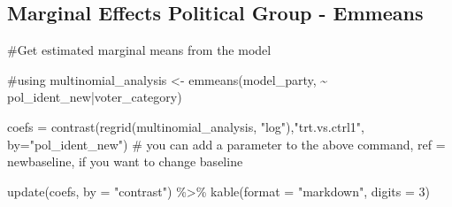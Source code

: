 \documentclass[
  letterpaper,
  DIV=11,
  numbers=noendperiod]{scrartcl}
\newenvironment{Shaded}{\begin{snugshade}}{\end{snugshade}}
\newcommand{\AttributeTok}[1]{\textcolor[rgb]{0.40,0.45,0.13}{#1}}
\newcommand{\CommentTok}[1]{\textcolor[rgb]{0.37,0.37,0.37}{#1}}
\newcommand{\DecValTok}[1]{\textcolor[rgb]{0.68,0.00,0.00}{#1}}
\newcommand{\FunctionTok}[1]{\textcolor[rgb]{0.28,0.35,0.67}{#1}}
\newcommand{\NormalTok}[1]{\textcolor[rgb]{0.00,0.23,0.31}{#1}}
\newcommand{\OtherTok}[1]{\textcolor[rgb]{0.00,0.23,0.31}{#1}}
\newcommand{\SpecialCharTok}[1]{\textcolor[rgb]{0.37,0.37,0.37}{#1}}
\newcommand{\StringTok}[1]{\textcolor[rgb]{0.13,0.47,0.30}{#1}}
\begin{document}
\subsection{Marginal Effects Political Group -
Emmeans}\label{marginal-effects-political-group---emmeans}

\begin{Shaded}
\begin{Highlighting}[]
\CommentTok{\#Get estimated marginal means from the model}

\CommentTok{\#using }
\NormalTok{multinomial\_analysis }\OtherTok{\textless{}{-}} \FunctionTok{emmeans}\NormalTok{(model\_party, }\SpecialCharTok{\textasciitilde{}}\NormalTok{ pol\_ident\_new}\SpecialCharTok{|}\NormalTok{voter\_category)}

\NormalTok{coefs }\OtherTok{=} \FunctionTok{contrast}\NormalTok{(}\FunctionTok{regrid}\NormalTok{(multinomial\_analysis, }\StringTok{"log"}\NormalTok{),}\StringTok{"trt.vs.ctrl1"}\NormalTok{,  }\AttributeTok{by=}\StringTok{"pol\_ident\_new"}\NormalTok{)}
\CommentTok{\# you can add a parameter to the above command, ref = newbaseline, if you want to change baseline}

\FunctionTok{update}\NormalTok{(coefs, }\AttributeTok{by =} \StringTok{"contrast"}\NormalTok{) }\SpecialCharTok{\%\textgreater{}\%} 
  \FunctionTok{kable}\NormalTok{(}\AttributeTok{format =} \StringTok{"markdown"}\NormalTok{, }\AttributeTok{digits =} \DecValTok{3}\NormalTok{)}
\end{Highlighting}
\end{Shaded}
\end{document}
